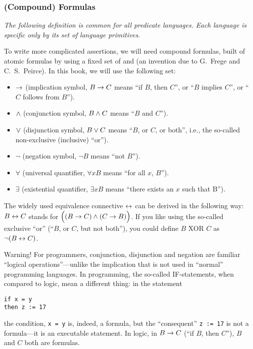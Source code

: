 \subsubsection*{(Compound) Formulas}

\emph{The following definition is common for all predicate languages.
Each language is specific only by its set of language primitives.}

To write more complicated assertions, we will need compound formulas, built of atomic formulas by using a fixed set of  and  (an invention due to G.~Frege and C.~S.~Peirce).
In this book, we will use the following set:

\begin{itemize}
    \item \(\rightarrow\) (implication symbol, \(B\rightarrow C\) means ``if \(B\), then \(C\)'', or ``\(B\) implies \(C\)'', or ``\(C\) follows from \(B\)'').
    \item \(\wedge\) (conjunction symbol, \(B\wedge C\) means ``\(B\) and \(C\)'').
    \item \(\vee\) (disjunction symbol, \(B\vee C\) means ``\(B\), or \(C\), or both'', i.e., the so-called non-exclusive (inclusive) ``or'').
    \item \(\neg\)  (negation symbol, \(\neg B\) means ``not \(B\)'').
    \item \(\forall\)  (universal quantifier, \(\forall xB\) means ``for all \(x\), \(B\)'').
    \item \(\exists\)  (existential quantifier, \(\exists xB\) means ``there exists an \(x\) such that B'').
\end{itemize}

The widely used equivalence connective \(\leftrightarrow\) can be derived in the following way: \(B\leftrightarrow C\) stands for \(\Big((B\rightarrow C)\wedge (C\rightarrow B)\Big)\).
If you like using the so-called exclusive ``or'' (``\(B\), or \(C\), but not both''), you could define \(B \text{ XOR } C\) as \(\neg (B\leftrightarrow C)\).

Warning! For programmers, conjunction, disjunction and negation are familiar ``logical operations''---unlike the implication that is not used in ``normal'' programming languages.
In programming, the so-called IF-statements, when compared to logic, mean a different thing: in the statement
\begin{verbatim}
if x = y
then z := 17
\end{verbatim}
the condition, \verb|x = y| is, indeed, a formula, but the ``consequent'' \verb|z := 17| is not a formula---it is an executable statement.
In logic, in \(B\rightarrow C\) (``if \(B\), then \(C\)''), \(B\) and \(C\) both are formulas.

